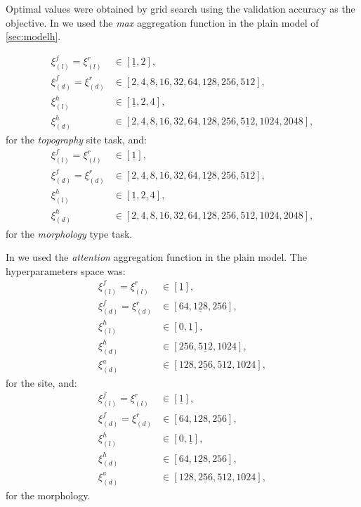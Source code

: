 Optimal values were obtained by grid search using the validation
accuracy as the objective.
In \maxp{} we used the \emph{max} aggregation function in the plain
model of \cref{sec:modelh}.

\begin{align*}
  \xi_{(l)}^f=\xi_{(l)}^r&\in[\underline{1},2],\\
  \xi_{(d)}^f=\xi_{(d)}^r&\in[2,4,8,16,32,64,\underline{128},256,512],\\
  \xi_{(l)}^h&\in[\underline{1},2,4],\\
  \xi_{(d)}^h&\in[2,4,8,16,32,64,128,256,\underline{512},1024,2048],
\end{align*}
for the \emph{topography} site task, and:
\begin{align*}
  \xi_{(l)}^f=\xi_{(l)}^r&\in[\underline{1}],\\
  \xi_{(d)}^f=\xi_{(d)}^r&\in[2,4,8,16,32,64,\underline{128},256,512],\\
  \xi_{(l)}^h&\in[\underline{1},2,4],\\
  \xi_{(d)}^h&\in[2,4,8,16,32,64,\underline{128},256,512,1024,2048],
\end{align*}
for the \emph{morphology} type task.

In \softmax{} we used the \emph{attention} aggregation function in the
plain model. The hyperparameters
space was:
\begin{align*}
  \xi_{(l)}^f=\xi_{(l)}^r&\in[\underline{1}],\\
  \xi_{(d)}^f=\xi_{(d)}^r&\in[64,\underline{128},256],\\
  \xi_{(l)}^h&\in[0,\underline{1}],\\
  \xi_{(d)}^h&\in[256,\underline{512},1024],\\
  \xi_{(d)}^a&\in[128,\underline{256},512,1024],
\end{align*}
for the site, and:
\begin{align*}
  \xi_{(l)}^f=\xi_{(l)}^r&\in[\underline{1}],\\
  \xi_{(d)}^f=\xi_{(d)}^r&\in[64,128,\underline{256}],\\
  \xi_{(l)}^h&\in[0,\underline{1}],\\
  \xi_{(d)}^h&\in[64,\underline{128},256],\\
  \xi_{(d)}^a&\in[128,\underline{256},512,1024],
\end{align*}
for the morphology.

